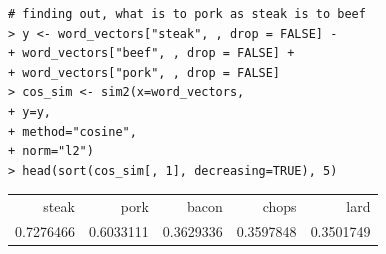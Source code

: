 \begin{verbatim}
# finding out, what is to pork as steak is to beef
> y <- word_vectors["steak", , drop = FALSE] -
+ word_vectors["beef", , drop = FALSE] +
+ word_vectors["pork", , drop = FALSE]
> cos_sim <- sim2(x=word_vectors,
+ y=y,
+ method="cosine",
+ norm="l2")
> head(sort(cos_sim[, 1], decreasing=TRUE), 5)
\end{verbatim}

\begin{center}
\begin{tabular}{rrrrr}
steak & pork & bacon & chops & lard \\
0.7276466 & 0.6033111 & 0.3629336 & 0.3597848 & 0.3501749 \\
\end{tabular}
\end{center}
